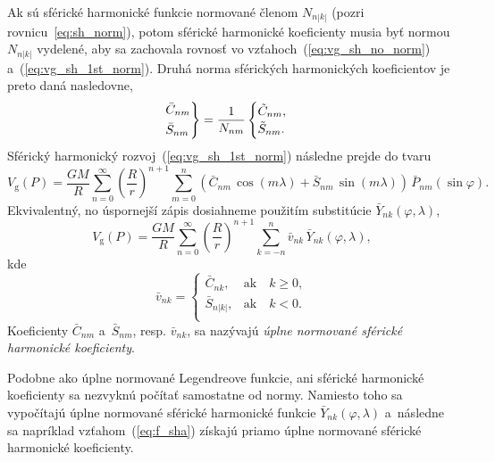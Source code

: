 \documentclass[a4paper,12pt]{book}
\newcommand{\gidx}{\mathrm g}
\begin{document}
Ak sú sférické harmonické funkcie normované členom $N_{n|k|}$ (pozri 
rovnicu~\ref{eq:sh_norm}), potom sférické harmonické koeficienty musia byť 
normou $N_{n|k|}$ vydelené, aby sa zachovala rovnosť vo 
vzťahoch~(\ref{eq:vg_sh_no_norm}) a~(\ref{eq:vg_sh_1st_norm}).  Druhá norma 
sférických harmonických koeficientov je preto daná nasledovne,
%
\begin{equation}
\label{eq:cnm_snm_2nd_norm}
\begin{rcases}
\bar{C}_{nm}\\
\bar{S}_{nm}
\end{rcases}
= \frac{1}{N_{nm}}
\begin{cases}
\tilde{C}_{nm}{,}\\
\tilde{S}_{nm}{.}
\end{cases}
\end{equation}
%
Sférický harmonický rozvoj~(\ref{eq:vg_sh_1st_norm}) následne prejde do tvaru
%
\begin{equation}
\label{eq:vg_sh_2nd_norm}
V_\gidx(P) = \frac{GM}{R} \sum_{n = 0}^\infty \left( \frac{R}{r} \right)^{n
+ 1} \sum_{m = 0}^{n} \left( \bar{C}_{nm} \, \cos(m\lambda) + \bar{S}_{nm} \,
\sin(m\lambda)\right) \, \bar{P}_{nm}(\sin\varphi){.}
\end{equation}
%
Ekvivalentný, no úspornejší zápis dosiahneme použitím substitúcie
$\bar{Y}_{nk}(\varphi, \lambda)$,
%
\begin{equation}
\label{eq:vg_sh_2nd_norm_ynk}
V_\gidx(P) = \frac{GM}{R} \sum_{n = 0}^\infty \left( \frac{R}{r} \right)^{n
+ 1} \sum_{k = -n}^{n} \bar{v}_{nk} \, \bar{Y}_{nk}(\varphi, \lambda){,}
\end{equation}
kde
%
\begin{equation}
\bar{v}_{nk} =
%
\begin{cases}
\bar{C}_{nk}{,}    &\text{ak} \quad k \geq 0{,}\\
\bar{S}_{n|k|}{,}  &\text{ak} \quad k < 0{.}\\
\end{cases}
\end{equation}
%
Koeficienty $\bar{C}_{nm}$ a~$\bar{S}_{nm}$, resp. $\bar{v}_{nk}$, sa nazývajú
\emph{úplne normované sférické harmonické koeficienty}.

Podobne ako úplne normované Legendreove funkcie, ani sférické
harmonické koeficienty sa nezvyknú počítať samostatne od normy.  Namiesto toho
sa vypočítajú úplne normované sférické harmonické funkcie
$\bar{Y}_{nk}(\varphi, \lambda)$ a~následne sa napríklad
vzťahom~(\ref{eq:f_sha}) získajú priamo úplne normované sférické harmonické
koeficienty.
\end{document}
